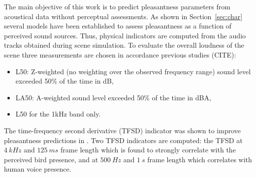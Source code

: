 \documentclass{article}
\begin{document}
\begin{sloppy}
The main objective of this work is to predict pleasantness parameters from acoustical data without perceptual assessments. As shown in Section~\ref{sec:char} several models have been established to assess pleasantness as a function of perceived sound sources. Thus, physical indicators are computed from the audio tracks obtained during scene simulation. To evaluate the overall loudness of the scene three measurements are chosen in accordance previous studies (CITE):
\begin{itemize}
\item L50: Z-weighted (no weighting over the observed frequency range) sound level exceeded 50\% of the time in dB,
\item LA50: A-weighted sound level exceeded 50\% of the time in dBA,
\item L50 for the 1kHz band only.
\end{itemize}
The time-frequency second derivative (TFSD) indicator was shown to improve pleasantness predictions in \cite{aumond}. Two TFSD indicators are computed: the TFSD at $4~kHz$ and $125~ms$ frame length which is found to strongly correlate with the perceived bird presence, and at $500~Hz$ and $1~s$ frame length which correlates with human voice presence.


\end{sloppy}
\end{document}
